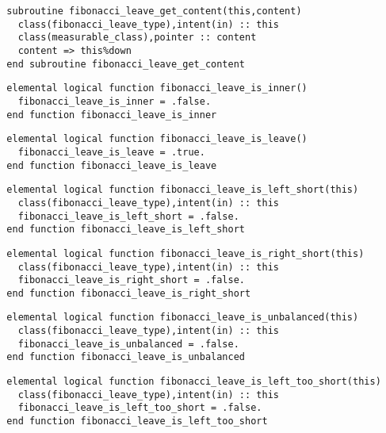 \begin{Verbatim}
  subroutine fibonacci_leave_get_content(this,content)
    class(fibonacci_leave_type),intent(in) :: this
    class(measurable_class),pointer :: content
    content => this%down
  end subroutine fibonacci_leave_get_content
\end{Verbatim}

\begin{Verbatim}
  elemental logical function fibonacci_leave_is_inner()
    fibonacci_leave_is_inner = .false.
  end function fibonacci_leave_is_inner
\end{Verbatim}

\begin{Verbatim}
  elemental logical function fibonacci_leave_is_leave()
    fibonacci_leave_is_leave = .true.
  end function fibonacci_leave_is_leave
\end{Verbatim}

\begin{Verbatim}
  elemental logical function fibonacci_leave_is_left_short(this)
    class(fibonacci_leave_type),intent(in) :: this
    fibonacci_leave_is_left_short = .false.
  end function fibonacci_leave_is_left_short
\end{Verbatim}

\begin{Verbatim}
  elemental logical function fibonacci_leave_is_right_short(this)
    class(fibonacci_leave_type),intent(in) :: this
    fibonacci_leave_is_right_short = .false.
  end function fibonacci_leave_is_right_short
\end{Verbatim}

\begin{Verbatim}
  elemental logical function fibonacci_leave_is_unbalanced(this)
    class(fibonacci_leave_type),intent(in) :: this
    fibonacci_leave_is_unbalanced = .false.
  end function fibonacci_leave_is_unbalanced
\end{Verbatim}

\begin{Verbatim}
  elemental logical function fibonacci_leave_is_left_too_short(this)
    class(fibonacci_leave_type),intent(in) :: this
    fibonacci_leave_is_left_too_short = .false.
  end function fibonacci_leave_is_left_too_short
\end{Verbatim}

